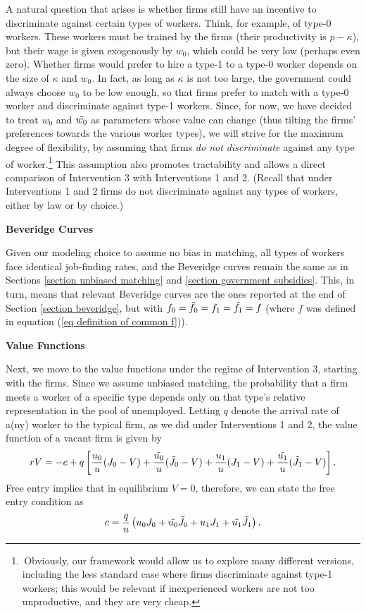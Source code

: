 \documentclass[12pt]{article} %
\theoremstyle{definition}
\begin{document}
A natural question that arises is whether firms still have an incentive to discriminate against certain types of workers. Think, for example, of type-0 workers. These workers must be trained by the firms (their productivity is $p-\kappa$), but their wage is given exogenously by $w_0$, which could be very low (perhaps even zero). Whether firms would prefer to hire a type-1 to a type-0 worker depends on the size of $\kappa$ and $w_0$. In fact, as long as $\kappa$ is not too large, the government could always choose $w_0$ to be low enough, so that firms prefer to match with a type-0 worker and discriminate against type-1 workers. Since, for now, we have decided to treat $w_0$ and $\Tilde{w_0}$ as parameters whose value can change (thus tilting the firms' preferences towards the various worker types), we will strive for the maximum degree of flexibility, by assuming that firms \textit{do not discriminate} against any type of worker.\footnote{\,Obviously, our framework would allow us to explore many different versions, including the less standard case where firms discriminate against type-1 workers; this would be relevant if inexperienced workers are not too unproductive, and they are very cheap.} This assumption also promotes tractability and allows a direct comparison of Intervention 3 with Interventions 1 and 2. (Recall that under Interventions 1 and 2 firms do not discriminate against any types of workers, either by law or by choice.)  

\bigskip 

\noindent \textbf{Beveridge Curves} 

\noindent Given our modeling choice to assume no bias in matching, all types of workers face identical job-finding rates, and the Beveridge curves remain the same as in Sections \ref{section unbiased matching} and \ref{section government subsidies}. This, in turn, means that relevant Beveridge curves are the ones reported at the end of Section \ref{section beveridge}, but with $f_0=\Tilde{f_0}=f_1=\Tilde{f_1}=f$ (where $f$ was defined in equation (\ref{eq definition of common f})). 

\bigskip 

\noindent \textbf{Value Functions}

\noindent Next, we move to the value functions under the regime of Intervention 3, starting with the firms. Since we assume unbiased matching, the probability that a firm meets a worker of a specific type depends only on that type's relative representation in the pool of unemployed. Letting $q$ denote the arrival rate of a(ny) worker to the typical firm, as we did under Interventions 1 and 2, the value function of a vacant firm is given by 
\begin{equation}
   rV = -c + q \left[\frac{u_0}{u}(J_0-V) + \frac{\Tilde{u_0}}{u}(\Tilde{J_0}-V) + \frac{u_1}{u}(J_1-V) +  \frac{\Tilde{u_1}}{u}(\Tilde{J_1}-V) \right].\nonumber 
\end{equation}Free entry implies that in equilibrium $V=0$, therefore, we can state the free entry condition as 
\begin{equation}
 c = \frac{q}{u} \left({u_0} J_0 + \Tilde{u_0} \Tilde{J_0} + {u_1} J_1 +  \Tilde{u_1} \Tilde{J_1} \right).\label{eq free entry inter 3} 
\end{equation}
\end{document}
